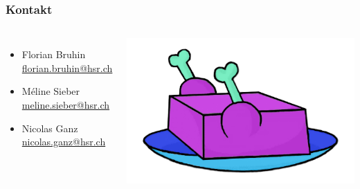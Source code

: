 \documentclass{beamer}
\begin{document}
  \begin{frame}
  \frametitle{Kontakt}
  \begin{columns}
    \begin{itemize}
      \item Florian Bruhin \\ \url{florian.bruhin@hsr.ch} \\[2em]
      \item Méline Sieber \\ \url{meline.sieber@hsr.ch} \\[2em]
      \item Nicolas Ganz \\ \url{nicolas.ganz@hsr.ch}
    \end{itemize}

		\includegraphics[width=\linewidth]{../../img/logo/kitovu.jpg}
  \end{columns}
  \end{frame}
\end{document}
